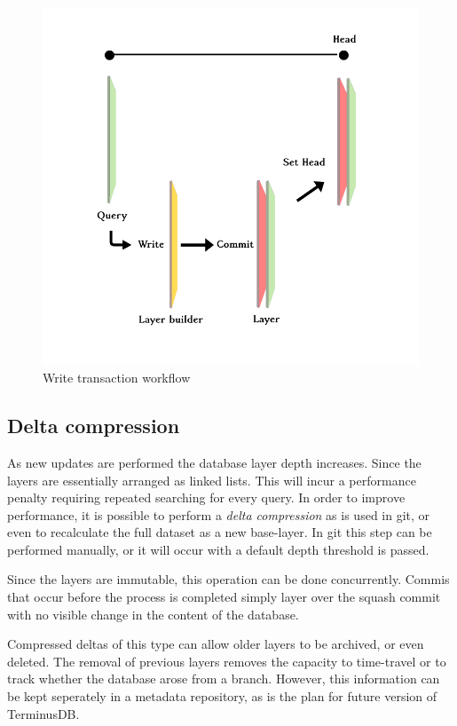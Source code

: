 \documentclass[10pt, a4paper, twocolumn]{article} %
\begin{document}
\begin{figure}
	\includegraphics[width=\linewidth]{query_write_commit_head} %
	\caption{Write transaction workflow} %
	\label{workflow} %
\end{figure}


\subsection{Delta compression}

As new updates are performed the database layer depth increases. Since
the layers are essentially arranged as linked lists. This will incur a
performance penalty requiring repeated searching for every query. In
order to improve performance, it is possible to perform a {\em delta
  compression} as is used in git, or even to recalculate the full
dataset as a new base-layer. In git this step can be performed
manually, or it will occur with a default depth threshold is passed.

Since the layers are immutable, this operation can be done
concurrently. Commis that occur before the process is completed simply
layer over the squash commit with no visible change in the content of
the database.

Compressed deltas of this type can allow older layers to be archived,
or even deleted. The removal of previous layers removes the capacity
to time-travel or to track whether the database arose from a
branch. However, this information can be kept seperately in a metadata
repository, as is the plan for future version of TerminusDB.
\end{document}
